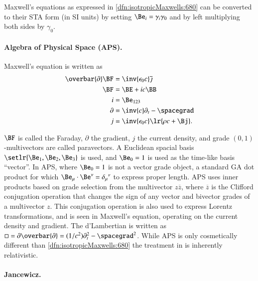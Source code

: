 Maxwell's equations as expressed in \cref{dfn:isotropicMaxwells:680} can be converted to their STA form (in SI units) by setting \( \Be_i = \gamma_i \gamma_0 \) and by left multiplying both sides by \( \gamma_0 \).

\paragraph{Algebra of Physical Space (APS).  \citep{baylis2004electrodynamics}}
Maxwell's equation is written as
\begin{dmath}\label{eqn:galiterature:40}
\begin{aligned}
\overbar{\partial} \BF &= \inv{\epsilon_0 c} \overline{\jmath} \\
\BF &= \BE + i c \BB \\
i &= \Be_{123} \\
\partial &= \inv{c} \partial_t - \spacegrad \\
j &= \inv{\epsilon_0 c} \lr{ \rho c + \Bj }.
\end{aligned}
\end{dmath}

\( \BF \) is called the Faraday, \( \partial \) the gradient, \( j \) the current density, and
grade \((0,1)\)-multivectors are called paravectors.
A Euclidean spacial basis \( \setlr{ \Be_1, \Be_2, \Be_3 } \) is used, and \( \Be_0 = 1 \) is used as the time-like basis ``vector''.
In APS, where \( \Be_0 = 1 \) is not a vector grade object, a standard GA dot product for which \( \Be_\mu \cdot \Be^\nu = {\delta_\mu}^\nu \)
to express proper length.
APS uses inner products based on grade selection from the multivector \( z \overbar{z} \), where
\( \overbar{z} \) is the Clifford conjugation operation
that changes the sign of any vector and bivector grades of a multivector \( z \).
This conjugation operation is also used to express Lorentz transformations, and is seen in Maxwell's equation, operating on the current density and gradient.
The d'Lambertian is written as \( \Box = \partial \overbar{\partial} = (1/c^2) \partial_t^2 - \spacegrad^2 \).
While APS is only cosmetically different than \cref{dfn:isotropicMaxwells:680} the treatment in \citep{baylis2004electrodynamics} is inherently relativistic.

\paragraph{Jancewicz.  \citep{jancewicz1988multivectors}}

